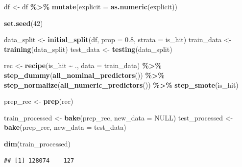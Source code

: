 \documentclass[
]{article}
\newenvironment{Shaded}{\begin{snugshade}}{\end{snugshade}}
\newcommand{\AttributeTok}[1]{\textcolor[rgb]{0.13,0.29,0.53}{#1}}
\newcommand{\ConstantTok}[1]{\textcolor[rgb]{0.56,0.35,0.01}{#1}}
\newcommand{\DecValTok}[1]{\textcolor[rgb]{0.00,0.00,0.81}{#1}}
\newcommand{\FloatTok}[1]{\textcolor[rgb]{0.00,0.00,0.81}{#1}}
\newcommand{\FunctionTok}[1]{\textcolor[rgb]{0.13,0.29,0.53}{\textbf{#1}}}
\newcommand{\NormalTok}[1]{#1}
\newcommand{\OtherTok}[1]{\textcolor[rgb]{0.56,0.35,0.01}{#1}}
\newcommand{\SpecialCharTok}[1]{\textcolor[rgb]{0.81,0.36,0.00}{\textbf{#1}}}
\begin{document}
\begin{Shaded}
\begin{Highlighting}[]
\NormalTok{df }\OtherTok{\textless{}{-}}\NormalTok{ df }\SpecialCharTok{\%\textgreater{}\%}
  \FunctionTok{mutate}\NormalTok{(}\AttributeTok{explicit =} \FunctionTok{as.numeric}\NormalTok{(explicit))}

\FunctionTok{set.seed}\NormalTok{(}\DecValTok{42}\NormalTok{)}

\NormalTok{data\_split }\OtherTok{\textless{}{-}} \FunctionTok{initial\_split}\NormalTok{(df, }\AttributeTok{prop =} \FloatTok{0.8}\NormalTok{, }\AttributeTok{strata =}\NormalTok{ is\_hit)}
\NormalTok{train\_data }\OtherTok{\textless{}{-}} \FunctionTok{training}\NormalTok{(data\_split)}
\NormalTok{test\_data }\OtherTok{\textless{}{-}} \FunctionTok{testing}\NormalTok{(data\_split)}

\NormalTok{rec }\OtherTok{\textless{}{-}} \FunctionTok{recipe}\NormalTok{(is\_hit }\SpecialCharTok{\textasciitilde{}}\NormalTok{ ., }\AttributeTok{data =}\NormalTok{ train\_data) }\SpecialCharTok{\%\textgreater{}\%}
  \FunctionTok{step\_dummy}\NormalTok{(}\FunctionTok{all\_nominal\_predictors}\NormalTok{()) }\SpecialCharTok{\%\textgreater{}\%}
  \FunctionTok{step\_normalize}\NormalTok{(}\FunctionTok{all\_numeric\_predictors}\NormalTok{()) }\SpecialCharTok{\%\textgreater{}\%}
  \FunctionTok{step\_smote}\NormalTok{(is\_hit)}

\NormalTok{prep\_rec }\OtherTok{\textless{}{-}} \FunctionTok{prep}\NormalTok{(rec)}

\NormalTok{train\_processed }\OtherTok{\textless{}{-}} \FunctionTok{bake}\NormalTok{(prep\_rec, }\AttributeTok{new\_data =} \ConstantTok{NULL}\NormalTok{)}
\NormalTok{test\_processed }\OtherTok{\textless{}{-}} \FunctionTok{bake}\NormalTok{(prep\_rec, }\AttributeTok{new\_data =}\NormalTok{ test\_data)}

\FunctionTok{dim}\NormalTok{(train\_processed)}
\end{Highlighting}
\end{Shaded}

\begin{verbatim}
## [1] 128074    127
\end{verbatim}

\begin{Shaded}
\end{Shaded}
\end{document}
